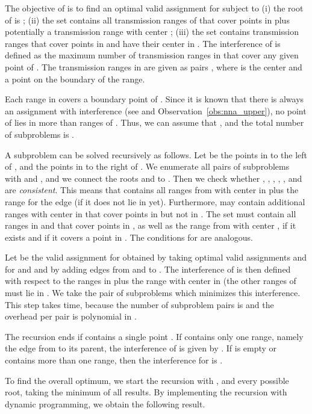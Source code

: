 \documentclass[envcountsect,envcountsame,runningheads,a4paper]{llncs}
\begin{document}
The objective of  is to find an optimal valid assignment  for
 subject to
(i) the root of  is ;
(ii) the set  contains all transmission ranges of
 that cover points in  plus potentially a
transmission range with center ;
(iii) the set  contains
transmission ranges that cover points in  and have their center in .
The interference of  is defined as the maximum number of transmission ranges in
 that cover any given point of .
The transmission ranges in  are given as pairs , where
 is the center and  a point on the boundary of the range.

Each range in  covers a boundary point of
.
Since it is known that there is always an assignment with interference
 (see \cite{RickenbachWaZo09} and Observation~\ref{obs:nna_upper}),
no point of  lies in more than 
ranges of . Thus, we can assume that
, and the total number
of subproblems is .

A subproblem  can be solved recursively as follows.
Let  be the points in  to the left of ,
and  the points in  to the right of .
We enumerate all pairs  of subproblems with
 and ,
and we connect the roots  and  to .
Then we check whether , , , ,
, and  are \emph{consistent}.
This means that   contains all ranges from  with center in
 plus the range for the edge 
(if it does not lie in  yet).
Furthermore,
 may contain additional ranges with center in  that cover
points in  but not in .
The set  must contain all ranges in  and 
that cover points in , as
well as the range from  with center , if it exists and if it
covers a point in .
The conditions for  are analogous.

Let  be the valid assignment for  obtained
by taking optimal valid assignments  and 
for  and  and
by adding edges from  and  to .
The interference of  is then defined with respect to
the ranges in  plus the range with
center  in  (the other ranges of  must lie in
. We take the
pair  of subproblems which minimizes this interference.
This step takes  time, because the number
of subproblem pairs is  and the overhead per pair is
polynomial in .

The recursion ends if  contains a single point . If 
contains only one range, namely the edge from  to its parent, the
interference of  is given by .
If  is empty or contains more than one range, then
the interference for  is .

To find the overall optimum, we start the recursion with
,  and every possible root, taking the
minimum of all results. By implementing the recursion with dynamic programming,
we obtain the following result.
\end{document}

